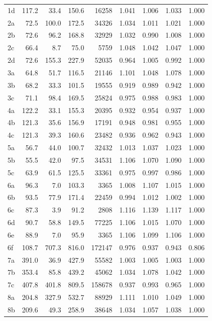 \begin{center}
\begin{longtable}{@{}l@{\hspace{6pt}}rrrr@{\hspace{8pt}}rrrr@{}}
1d & 117.2 & 33.4 & 150.6 & 16258 & 1.041 & 1.006 & 1.033 & 1.000 \\
2a & 72.5 & 100.0 & 172.5 & 34326 & 1.034 & 1.011 & 1.021 & 1.000 \\
2b & 72.6 & 96.2 & 168.8 & 32929 & 1.032 & 0.990 & 1.008 & 1.000 \\
2c & 66.4 & 8.7 & 75.0 & 5759 & 1.048 & 1.042 & 1.047 & 1.000 \\
2d & 72.6 & 155.3 & 227.9 & 52035 & 0.964 & 1.005 & 0.992 & 1.000 \\
3a & 64.8 & 51.7 & 116.5 & 21146 & 1.101 & 1.048 & 1.078 & 1.000 \\
3b & 68.2 & 33.3 & 101.5 & 19555 & 0.919 & 0.989 & 0.942 & 1.000 \\
3c & 71.1 & 98.4 & 169.5 & 25824 & 0.975 & 0.988 & 0.983 & 1.000 \\
4a & 122.2 & 33.1 & 155.3 & 20395 & 0.932 & 0.954 & 0.937 & 1.000 \\
4b & 121.3 & 35.6 & 156.9 & 17191 & 0.948 & 0.981 & 0.955 & 1.000 \\
4c & 121.3 & 39.3 & 160.6 & 23482 & 0.936 & 0.962 & 0.943 & 1.000 \\
5a & 56.7 & 44.0 & 100.7 & 32432 & 1.013 & 1.037 & 1.023 & 1.000 \\
5b & 55.5 & 42.0 & 97.5 & 34531 & 1.106 & 1.070 & 1.090 & 1.000 \\
5c & 63.9 & 61.5 & 125.5 & 33361 & 0.975 & 0.997 & 0.986 & 1.000 \\
6a & 96.3 & 7.0 & 103.3 & 3365 & 1.008 & 1.107 & 1.015 & 1.000 \\
6b & 93.5 & 77.9 & 171.4 & 22459 & 0.994 & 1.012 & 1.002 & 1.000 \\
6c & 87.3 & 3.9 & 91.2 & 2808 & 1.116 & 1.139 & 1.117 & 1.000 \\
6d & 90.7 & 58.8 & 149.5 & 77225 & 1.106 & 1.015 & 1.070 & 1.000 \\
6e & 88.9 & 7.0 & 95.9 & 3365 & 1.106 & 1.099 & 1.106 & 1.000 \\
6f & 108.7 & 707.3 & 816.0 & 172147 & 0.976 & 0.937 & 0.943 & 0.806 \\
7a & 391.0 & 36.9 & 427.9 & 55582 & 1.003 & 1.005 & 1.003 & 1.000 \\
7b & 353.4 & 85.8 & 439.2 & 45062 & 1.034 & 1.078 & 1.042 & 1.000 \\
7c & 407.8 & 401.8 & 809.5 & 158678 & 0.937 & 0.993 & 0.965 & 1.000 \\
8a & 204.8 & 327.9 & 532.7 & 88929 & 1.111 & 1.010 & 1.049 & 1.000 \\
8b & 209.6 & 49.3 & 258.9 & 38648 & 1.034 & 1.057 & 1.038 & 1.000 \\

\end{longtable}
\end{center}
